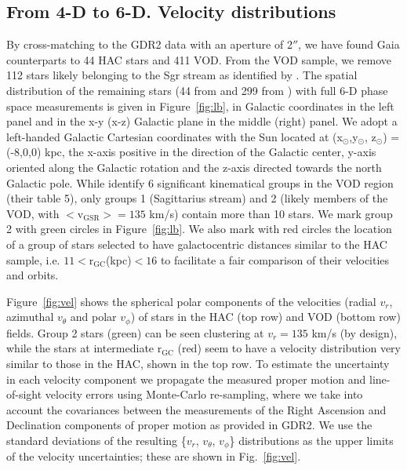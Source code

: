 \documentclass[fleqn,usenatbib]{mnras}
\begin{document}
%
\subsection{From 4-D to 6-D. Velocity distributions}

By cross-matching to the GDR2 data with an aperture of 2$''$, we have
found Gaia counterparts to 44 HAC stars and 411 VOD. From the VOD
sample, we remove 112 stars likely belonging to the Sgr stream as
identified by \citep[][, their group 1]{Vivas2016}. The spatial
distribution of the remaining stars (44 from \citealt{Simion2018} and
299 from \citealt{Vivas2016}) with full 6-D phase space measurements
is given in Figure~\ref{fig:lb}, in Galactic coordinates in the left
panel and in the x-y (x-z) Galactic plane in the middle (right)
panel. We adopt a left-handed Galactic Cartesian coordinates with the
Sun located at (x$_{\odot}$,y$_{\odot}$, z$_{\odot}$) = (-8,0,0) kpc,
the x-axis positive in the direction of the Galactic center, y-axis
oriented along the Galactic rotation and the z-axis directed towards
the north Galactic pole. While \citealt{Vivas2016} identify 6
significant kinematical groups in the VOD region (their table 5), only
groups 1 (Sagittarius stream) and 2 (likely members of the VOD, with
$\mathrm{<v_{GSR}>}= 135$ km/s) contain more than 10 stars. We mark
group 2 with green circles in Figure~\ref{fig:lb}. We also mark with
red circles the location of a group of stars selected to have
galactocentric distances similar to the HAC sample, i.e.
$11\mathrm{<r_{GC}}$(kpc)$<16$ to facilitate a fair comparison of their
velocities and orbits.

Figure~\ref{fig:vel} shows the spherical polar components of the
velocities (radial $v_{r}$, azimuthal $v_{\theta}$ and polar
$v_{\phi}$) of stars in the HAC (top row) and VOD (bottom row)
fields. Group 2 stars (green) can be seen clustering at $v_{r} = 135$
km/s (by design), while the stars at intermediate $\mathrm{r_{GC}}$
(red) seem to have a velocity distribution very similar to those in
the HAC, shown in the top row. To estimate the uncertainty in each
velocity component we propagate the measured proper motion and
line-of-sight velocity errors using Monte-Carlo re-sampling, where we
take into account the covariances between the measurements of the
Right Ascension and Declination components of proper motion as
provided in GDR2. We use the standard deviations of the resulting
\{$v_{r}$, $v_{\theta}$, $v_{\phi}$\} distributions as the upper limits
of the velocity uncertainties; these are shown in Fig.~\ref{fig:vel}.
\end{document}
